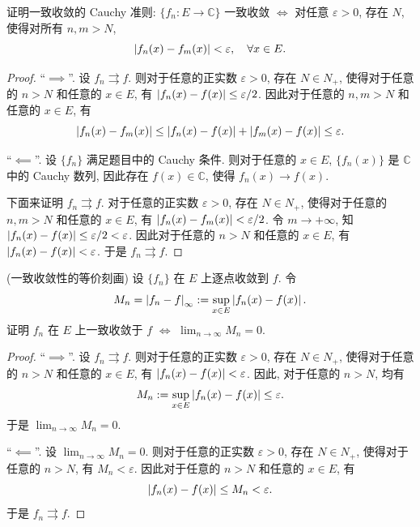 \documentclass{article}
\begin{document}
\begin{problem}
证明一致收敛的 Cauchy 准则: $\{f_n:E\to\mathbb{C}\}$ 一致收敛 $\Longleftrightarrow$ 对任意 $\varepsilon>0$, 存在 $N$, 使得对所有 $n,m>N$,
\[
\left|f_n(x)-f_m(x)\right|<\varepsilon,\quad \forall x\in E.
\]
\end{problem}

\begin{proof}
  ``\( \implies \)''. 设 \( f_n \rightrightarrows f \). 则对于任意的正实数 \( \varepsilon>0 \), 存在 \( N\in N_+ \), 使得对于任意的 \( n>N \) 和任意的 \( x\in E \), 有 \( \left|f_n(x)-f(x)\right| \leq \varepsilon/2 \). 因此对于任意的 \( n,m>N \) 和任意的 \( x\in E \), 有
  \[ \left|f_n(x)-f_m(x)\right| \leq \left|f_n(x)-f(x)\right| + \left|f_m(x)-f(x)\right| \leq \varepsilon. \]

  ``\( \impliedby \)''. 设 \( \{f_n\} \) 满足题目中的 Cauchy 条件. 则对于任意的 \( x\in E \), \( \{f_n(x)\} \) 是 \( \mathbb{C} \) 中的 Cauchy 数列, 因此存在 \( f(x)\in\mathbb{C} \), 使得 \( f_n(x)\to f(x) \). 
  
  下面来证明 \( f_n\rightrightarrows f \). 对于任意的正实数 \( \varepsilon>0 \), 存在 \( N\in N_+ \), 使得对于任意的 \( n,m>N \) 和任意的 \( x\in E \), 有 \( \left|f_n(x)-f_m(x)\right|<\varepsilon/2 \). 令 \( m\to+\infty \), 知 \( \left|f_n(x)-f(x)\right| \leq \varepsilon/2 < \varepsilon \). 因此对于任意的 \( n>N \) 和任意的 \( x\in E \), 有 \( \left|f_n(x)-f(x)\right|<\varepsilon \). 于是 \( f_n\rightrightarrows f \).
\end{proof}



\begin{problem}
(一致收敛性的等价刻画)
设 $\{f_n\}$ 在 $E$ 上逐点收敛到 $f$. 令
\[
M_n=\left|f_n-f\right|_\infty:=\sup_{x\in E}\left|f_n(x)-f(x)\right|.
\]
证明 $f_n$ 在 $E$ 上一致收敛于 $f$ $\Longleftrightarrow$ $\lim_{n\to\infty}M_n=0$.
\end{problem}

\begin{proof}
  ``\( \implies \)''. 设 \( f_n\rightrightarrows f \). 则对于任意的正实数 \( \varepsilon>0 \), 存在 \( N\in N_+ \), 使得对于任意的 \( n>N \) 和任意的 \( x\in E \), 有 \( \left|f_n(x)-f(x)\right|<\varepsilon \). 因此, 对于任意的 \( n>N \), 均有
  \[ M_n:=\sup_{x\in E}\left|f_n(x)-f(x)\right| \leq \varepsilon. \]
  于是 \( \lim_{n\to\infty}M_n=0 \).

  ``\( \impliedby \)''. 设 \( \lim_{n\to\infty}M_n=0 \). 则对于任意的正实数 \( \varepsilon>0 \), 存在 \( N\in N_+ \), 使得对于任意的 \( n>N \), 有 \( M_n<\varepsilon \). 因此对于任意的 \( n>N \) 和任意的 \( x\in E \), 有
  \[ \left|f_n(x)-f(x)\right| \leq M_n < \varepsilon. \]  于是 \( f_n\rightrightarrows f \).
\end{proof}
\end{document}
